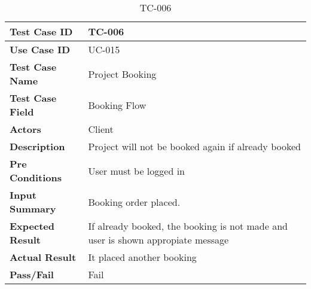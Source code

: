 
\begin{table}[h]
    \centering
    \caption{TC-006}
    \begin{tabular}{ |p{3.8cm}|p{8cm}| }
        \hline
        \textbf{Test Case ID}    & TC-006                                                                          \\
        \hline
        \textbf{Use Case ID}     & UC-015                                                                          \\
        \hline
        \textbf{Test Case Name}  & Project Booking                                                                 \\
        \hline
        \textbf{Test Case Field} & Booking Flow                                                                    \\
        \hline
        \textbf{Actors}          & Client                                                                          \\
        \hline
        \textbf{Description}     & Project will not be booked again if already booked                              \\
        \hline
        \textbf{Pre Conditions}  & User must be logged in                                                          \\
        \hline
        \textbf{Input Summary}   & Booking order placed.                                                           \\
        \hline
        \textbf{Expected Result} & If already booked, the booking is not made and user is shown appropiate message \\
        \hline
        \textbf{Actual Result}   & It placed another booking                                                       \\
        \hline
        \textbf{Pass/Fail}       & Fail                                                                            \\
        \hline
    \end{tabular}
\end{table}